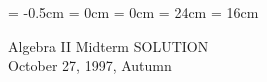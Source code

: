 

\topmargin = -0.5cm
\oddsidemargin = 0cm \evensidemargin = 0cm
\textheight = 24cm \textwidth = 16cm %

\pagestyle{empty}

\newtheorem{thm}{定理}
\newcommand{\bZ}{\mbox{\boldmath $Z$}}
\newcommand{\bQ}{\mbox{\boldmath $Q$}}
\newcommand{\bR}{\mbox{\boldmath $R$}}
\newcommand{\bC}{\mbox{\boldmath $C$}}
\newcommand{\bigx}{{\large $\times$}}
\newcommand{\qed}{\hfill\hbox{\rule{6pt}{6pt}}}
\newcommand{\sol}{{\gt \mbox{解．}\quad}}


\begin{center}
{\LARGE\gt Algebra II  Midterm} {\LARGE\sf SOLUTION}\\
{\gt October 27, 1997, Autumn}
\end{center}


